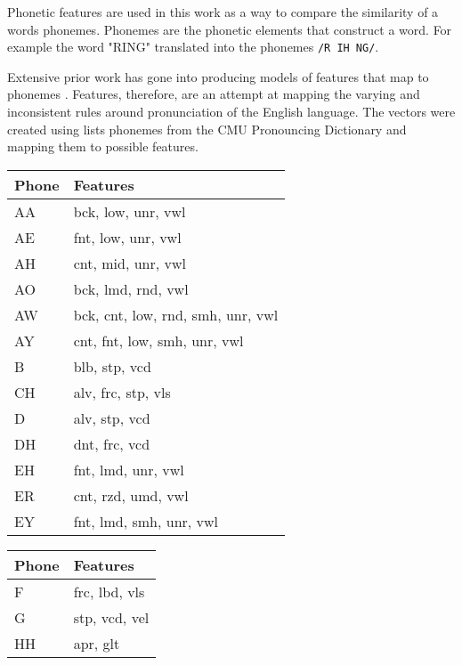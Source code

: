 Phonetic features are used in this work as a way to compare the similarity of a words phonemes. Phonemes are the phonetic elements that construct a word. For example the word "RING" translated into the phonemes \verb|/R IH NG/|. 

Extensive prior work has gone into producing models of features that map to phonemes \cite{chomsky1968sound}\cite{ladefoged1969measurement}\cite{bradlow2010perceptual}. Features, therefore, are an attempt at mapping the varying and inconsistent rules around pronunciation of the English language. The vectors were created using lists phonemes from the CMU Pronouncing Dictionary and mapping them to possible features.

\begin{table}[!htb]
    \tiny
    \begin{minipage}{.33\linewidth}
        \centering
        \begin{tabular}{ll}
            Phone & Features \\
            \hline
            AA & bck, low, unr, vwl \\
            AE & fnt, low, unr, vwl \\
            AH & cnt, mid, unr, vwl \\
            AO & bck, lmd, rnd, vwl \\
            AW & bck, cnt, low, rnd, smh, unr, vwl \\
            AY & cnt, fnt, low, smh, unr, vwl \\
            B & blb, stp, vcd \\
            CH & alv, frc, stp, vls \\
            D & alv, stp, vcd \\
            DH & dnt, frc, vcd \\
            EH & fnt, lmd, unr, vwl \\
            ER & cnt, rzd, umd, vwl \\
            EY & fnt, lmd, smh, unr, vwl
        \end{tabular}
    \end{minipage}%
    \begin{minipage}{.33\linewidth}
        \centering
        \begin{tabular}{ll}
            Phone & Features \\
            \hline
            F &  frc, lbd, vls \\
            G &  stp, vcd, vel \\
            HH & apr, glt \\

\end{tabular}
\end{minipage}
\end{table}
